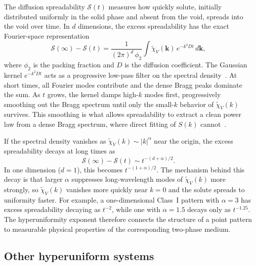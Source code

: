 \documentclass[11pt]{article}
\begin{document}
The diffusion spreadability $\mathcal{S}(t)$ measures how quickly solute, initially distributed uniformly in the solid phase and absent from the void, spreads into the void over time. In $d$ dimensions, the excess spreadability has the exact Fourier-space representation~\cite{torquato2021spreadability}
\begin{equation}
 \mathcal{S}(\infty) - \mathcal{S}(t) = \frac{1}{(2\pi)^d\,\phi_2}\int \tilde\chi_V(\mathbf{k})\,e^{-k^2 D t}\,d\mathbf{k},
 \label{eq:spreadability}
\end{equation}
where $\phi_2$ is the packing fraction and $D$ is the diffusion coefficient. The Gaussian kernel $e^{-k^2 Dt}$ acts as a progressive low-pass filter on the spectral density~\cite{hitinbialus2024,wang2022spreadability}. At short times, all Fourier modes contribute and the dense Bragg peaks dominate the sum. As $t$ grows, the kernel damps high-$k$ modes first, progressively smoothing out the Bragg spectrum until only the small-$k$ behavior of $\tilde\chi_V(k)$ survives. This smoothing is what allows spreadability to extract a clean power law from a dense Bragg spectrum, where direct fitting of $S(k)$ cannot~\cite{hitinbialus2024}.

If the spectral density vanishes as $\tilde\chi_V(k) \sim |k|^\alpha$ near the origin, the excess spreadability decays at long times as~\cite{torquato2021spreadability}
\begin{equation}
 \mathcal{S}(\infty) - \mathcal{S}(t) \sim t^{-(d+\alpha)/2}.
 \label{eq:spread-powerlaw}
\end{equation}
In one dimension ($d = 1$), this becomes $t^{-(1+\alpha)/2}$. The mechanism behind this decay is that larger $\alpha$ suppresses long-wavelength modes of $\tilde\chi_V(k)$ more strongly, so $\tilde\chi_V(k)$ vanishes more quickly near $k = 0$ and the solute spreads to uniformity faster. For example, a one-dimensional Class~I pattern with $\alpha = 3$ has excess spreadability decaying as $t^{-2}$, while one with $\alpha = 1.5$ decays only as $t^{-1.25}$. The hyperuniformity exponent therefore connects the structure of a point pattern to measurable physical properties of the corresponding two-phase medium.

\subsection{Other hyperuniform systems}
\label{sec:theory-comparison}
\end{document}
